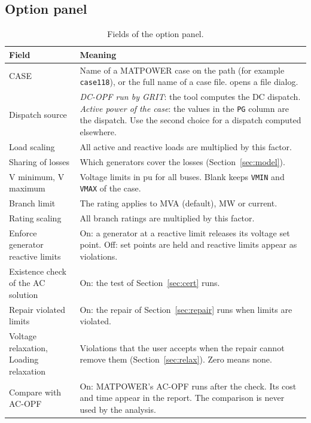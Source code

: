 \documentclass[a4paper,11pt]{article}
\newcommand{\btn}[1]{\fcolorbox{gray!60}{gray!10}{\small\textsf{#1}}}
\begin{document}
\subsection{Option panel}\label{sec:panel}

\begin{table}[H]\centering\small
\begin{tabular}{@{}p{4.6cm}p{10.4cm}@{}}
\toprule
\textbf{Field} & \textbf{Meaning} \\
\midrule
CASE & Name of a MATPOWER case on the path (for example \texttt{case118}), or the full name of a case file. \btn{Browse for a case file} opens a file dialog. \\
Dispatch source & \emph{DC-OPF run by GRIT}: the tool computes the DC dispatch. \emph{Active power of the case}: the values in the \texttt{PG} column are the dispatch. Use the second choice for a dispatch computed elsewhere. \\
Load scaling & All active and reactive loads are multiplied by this factor. \\
Sharing of losses & Which generators cover the losses (Section~\ref{sec:model}). \\
V minimum, V maximum & Voltage limits in pu for all buses. Blank keeps \texttt{VMIN} and \texttt{VMAX} of the case. \\
Branch limit & The rating applies to MVA (default), MW or current. \\
Rating scaling & All branch ratings are multiplied by this factor. \\
Enforce generator reactive limits & On: a generator at a reactive limit releases its voltage set point. Off: set points are held and reactive limits appear as violations. \\
Existence check of the AC solution & On: the test of Section~\ref{sec:cert} runs. \\
Repair violated limits & On: the repair of Section~\ref{sec:repair} runs when limits are violated. \\
Voltage relaxation, Loading relaxation & Violations that the user accepts when the repair cannot remove them (Section~\ref{sec:relax}). Zero means none. \\
Compare with AC-OPF & On: MATPOWER's AC-OPF runs after the check. Its cost and time appear in the report. The comparison is never used by the analysis. \\
\bottomrule
\end{tabular}
\caption{Fields of the option panel.}
\end{table}
\end{document}
